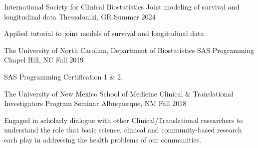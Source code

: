 

\begin{cventries}

  \cventry
    {International Society for Clinical Biostatistics} %
    {Joint modeling of survival and longitudinal data} %
    {Thessaloniki, GR} %
    {Summer 2024} %
    {
      \begin{cvitems} %
        \item Applied tutorial to joint models of survival and longitudinal data.  
      \end{cvitems}
    }
    
  \cventry
    {The University of North Carolina, Department of Biostatistics} %
    {SAS Programming} %
    {Chapel Hill, NC} %
    {Fall 2019} %
    {
      \begin{cvitems} %
        \item SAS Programming Certification 1 \& 2.
      \end{cvitems}
    }


  \cventry
    {The University of New Mexico School of Medicine} %
    {Clinical \& Translational Investigators Program Seminar} %
    {Albuquerque, NM} %
    {Fall 2018} %
    {
      \begin{cvitems} %
\item Engaged in scholarly dialogue with other Clinical/Translational researchers to understand the role that basic science, \newline clinical and community-based research each play in addressing the health problems of our communities.
      \end{cvitems}
    }



\end{cventries}
